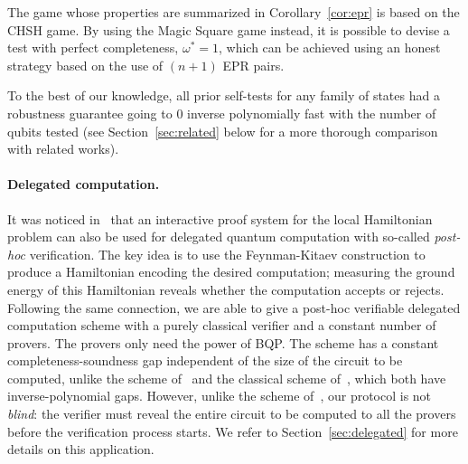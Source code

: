 \documentclass[11pt,letterpaper]{article}
\newcommand{\<}{\langle}
\renewcommand{\>}{\rangle}
\begin{document}
The game whose properties are summarized in Corollary~\ref{cor:epr} is based on the CHSH game. By using the Magic Square game instead, it is possible to devise a test with perfect completeness, $\omega^*=1$, which can be achieved using an honest strategy based on the use of $(n+1)$ EPR pairs.

To the best of our knowledge, all prior self-tests for any family of states had a robustness guarantee going to $0$ inverse polynomially fast with the number of qubits tested (see Section~\ref{sec:related} below for a more thorough comparison with related works). 

\paragraph{Delegated computation.}
It was noticed in~\cite{FitzsimonsH15} that an interactive proof
system for the local Hamiltonian problem can also be used for
delegated quantum computation with so-called \emph{post-hoc}
verification. The key idea is to use the Feynman-Kitaev construction
to produce a Hamiltonian encoding the desired computation; measuring
the ground energy of this Hamiltonian reveals whether the computation
accepts or rejects.
Following the same connection, we are able to give a post-hoc
verifiable delegated computation scheme with a purely classical
verifier and a constant number of provers. The provers only need the
power of BQP. The scheme has a constant completeness-soundness gap
independent of the size of the circuit to be computed, unlike the
scheme of~\cite{FitzsimonsH15} and the classical scheme
of~\cite{ReichardtUV13nature}, which both have inverse-polynomial
gaps. However, unlike the scheme of~\cite{ReichardtUV13nature}, our
protocol is not \emph{blind}: the verifier must reveal the entire
circuit to be computed to all the provers before the verification
process starts. We refer to Section~\ref{sec:delegated} for more
details on this application. 



\end{document}
